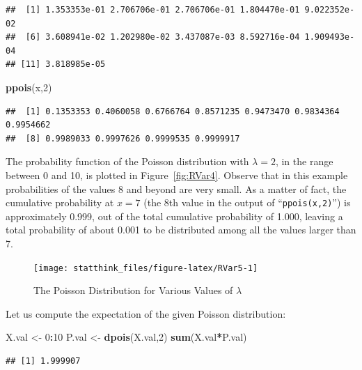 \documentclass[
]{krantz}
\makeatletter
\newenvironment{Shaded}{\begin{snugshade}}{\end{snugshade}}
\newcommand{\DecValTok}[1]{\textcolor[rgb]{0.00,0.00,0.81}{#1}}
\newcommand{\KeywordTok}[1]{\textcolor[rgb]{0.13,0.29,0.53}{\textbf{#1}}}
\newcommand{\NormalTok}[1]{#1}
\newcommand{\OperatorTok}[1]{\textcolor[rgb]{0.81,0.36,0.00}{\textbf{#1}}}
\newcommand{\StringTok}[1]{\textcolor[rgb]{0.31,0.60,0.02}{#1}}
\newenvironment{kframe}{%
\medskip{}
\setlength{\fboxsep}{.8em}
 \def\at@end@of@kframe{}%
 \ifinner\ifhmode%
  \def\at@end@of@kframe{\end{minipage}}%
  \begin{minipage}{\columnwidth}%
 \fi\fi%
 \def\FrameCommand##1{\hskip\@totalleftmargin \hskip-\fboxsep
 \colorbox{shadecolor}{##1}\hskip-\fboxsep
     \hskip-\linewidth \hskip-\@totalleftmargin \hskip\columnwidth}%
 \MakeFramed {\advance\hsize-\width
   \@totalleftmargin\z@ \linewidth\hsize
   \@setminipage}}%
 {\par\unskip\endMakeFramed%
 \at@end@of@kframe}
\renewenvironment{Shaded}{\begin{kframe}}{\end{kframe}}
\theoremstyle{definition}
\theoremstyle{definition}
\theoremstyle{definition}
\theoremstyle{remark}
\makeatother
\begin{document}
\begin{verbatim}
##  [1] 1.353353e-01 2.706706e-01 2.706706e-01 1.804470e-01 9.022352e-02
##  [6] 3.608941e-02 1.202980e-02 3.437087e-03 8.592716e-04 1.909493e-04
## [11] 3.818985e-05
\end{verbatim}

\begin{Shaded}
\begin{Highlighting}[]
\KeywordTok{ppois}\NormalTok{(x,}\DecValTok{2}\NormalTok{)}
\end{Highlighting}
\end{Shaded}

\begin{verbatim}
##  [1] 0.1353353 0.4060058 0.6766764 0.8571235 0.9473470 0.9834364 0.9954662
##  [8] 0.9989033 0.9997626 0.9999535 0.9999917
\end{verbatim}

The probability function of the Poisson distribution with \(\lambda = 2\),
in the range between 0 and 10, is plotted in
Figure~\ref{fig:RVar4}. Observe that in this example probabilities
of the values 8 and beyond are very small. As a matter of fact, the
cumulative probability at \(x=7\) (the 8th value in the output of
``\texttt{ppois(x,2)}'') is approximately 0.999, out of the total cumulative
probability of 1.000, leaving a total probability of about 0.001 to be
distributed among all the values larger than 7.

\begin{figure}

{\centering \texttt{[image: statthink\_files/figure-latex/RVar5-1]} 

}

\caption{The Poisson Distribution for Various Values of $\lambda$}\label{fig:RVar5}
\end{figure}

Let us compute the expectation of the given Poisson distribution:

\begin{Shaded}
\begin{Highlighting}[]
\NormalTok{X.val <-}\StringTok{ }\DecValTok{0}\OperatorTok{:}\DecValTok{10}
\NormalTok{P.val <-}\StringTok{ }\KeywordTok{dpois}\NormalTok{(X.val,}\DecValTok{2}\NormalTok{)}
\KeywordTok{sum}\NormalTok{(X.val}\OperatorTok{*}\NormalTok{P.val)}
\end{Highlighting}
\end{Shaded}

\begin{verbatim}
## [1] 1.999907
\end{verbatim}
\end{document}
